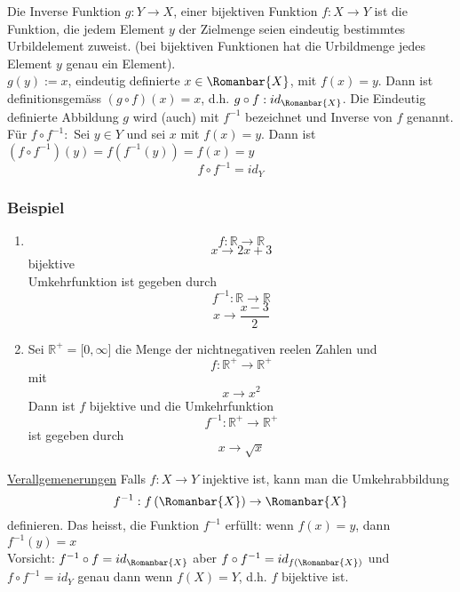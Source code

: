 Die Inverse Funktion $g:Y\rightarrow X$, einer bijektiven Funktion $f:X\rightarrow Y$ ist die Funktion, die jedem Element $y$ der Zielmenge seien eindeutig bestimmtes Urbildelement zuweist. (bei bijektiven Funktionen hat die Urbildmenge jedes Element $y$ genau ein Element). \\

 $g(y):=x$, eindeutig definierte $ x\in\Romanbar{X}$, mit $f(x)=y$. Dann ist definitionsgemäss $(g\circ f)(x)=x$, d.h. $g\circ f:id_{\Romanbar{X}}$. Die Eindeutig definierte Abbildung $g$ wird (auch) mit $f^{-1}$ bezeichnet und Inverse von $f$ genannt.\\

Für $f\circ f^{-1}:$ Sei $y\in Y$ und sei $x$ mit $f(x)=y$. Dann ist $\left( f\circ f^{-1}\right)(y)=f\left(f^{-1}(y)\right)=f(x)=y$ \[f\circ f^{-1}=id_Y\]

\subsubsection*{Beispiel}
\begin{enumerate}
\item \[f:\mathbb{R}\rightarrow\mathbb{R}\]\[x\rightarrow 2x+3\] bijektive\\
Umkehrfunktion ist gegeben durch \[f^{-1}:\mathbb{R}\rightarrow\mathbb{R}\]\[x\rightarrow\frac{x-3}{2}\]
\item Sei $\mathbb{R}^+=\lbrack 0,\infty\rbrack$ die Menge der nichtnegativen reelen Zahlen und \[f:\mathbb{R}^+\rightarrow\mathbb{R}^+\] mit \[x\rightarrow x^2\]
Dann ist $f$ bijektive und die Umkehrfunktion \[f^{-1}:\mathbb{R}^+\rightarrow\mathbb{R}^+\] ist gegeben durch \[x\rightarrow\sqrt{x}\]
\end{enumerate}

\underline{Verallgemenerungen}
Falls $f:X\rightarrow Y$ injektive ist, kann man die Umkehrabbildung \[f^{-1}:f\left(\Romanbar{X}\right)\rightarrow\Romanbar{X}\] definieren. Das heisst, die Funktion $f^{-1}$ erfüllt: wenn $f(x)=y$, dann $f^{-1}(y)=x$\\

\noindent Vorsicht: $f^{-1}\circ f=id_{\Romanbar{X}}$ aber $f\circ f^{-1}=id_{f\left(\Romanbar{X}\right)}$ und $f\circ f^{-1}=id_Y$ genau dann wenn $f(X)=Y$, d.h. $f$ bijektive ist.
